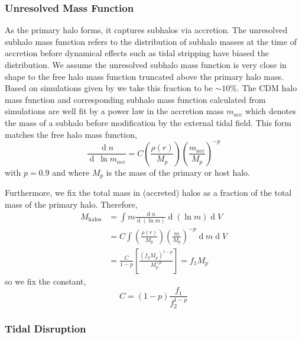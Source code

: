 \documentclass[usenatbib]{mnras}
\renewcommand{\d}[1]{\! \mathrm{d}#1 \:}
\newcommand{\deriv}[2]{\frac{\d{#1}}{\d{#2}}}
\renewcommand{\d}[1]{\ensuremath{\operatorname{d}\!{#1}}}
\begin{document}
\subsubsection{Unresolved Mass Function}

	As the primary halo forms, it captures subhalos via accretion. The unresolved subhalo mass function refers to the distribution of subhalo masses at the time of accretion before dynamical effects such as tidal stripping have biased the distribution. We assume the unresolved subhalo mass function is very close in shape to the free halo mass function truncated above the primary halo mass. Based on simulations given by \citet{dark_wave} we take this fraction to be $\sim 10\%$. The CDM halo mass function and corresponding subhalo mass function calculated from simulations \citep{pop_of_subhalos, unified_model} are well fit by a power law in the accretion mass $m_{acc}$ which denotes the mass of a subhalo before modification by the external tidal field. This form matches the free halo mass function, 
\begin{equation}
\frac{\d{n}}{\d{\: \ln{m_{acc}}}} = C \left(\frac{\rho(r)}{M_p}\right) \left(\frac{m_{acc}}{M_p} \right)^{-p} 
\end{equation}
with $p = 0.9$ and where $M_p$ is the mass of the primary or host halo.
\par
Furthermore, we fix the total mass in (accreted) halos as a fraction of the total mass of the primary halo. Therefore,
\begin{subequations}
\begin{align}
M_{\mathrm{halos}} & = \int m \deriv{n}{(\ln{m})} \d{(\ln{m})} \d{V}
\\
& = C \int \left(\frac{\rho(r)}{M_p}\right) \left(\frac{m}{M_p} \right)^{-p} \d{m} \d{V} 
\\
& = \frac{C}{1-p} \left[ \frac{(f_2 M_p)^{1-p}}{M_p^{-p}} \right] = f_1 M_p 
\end{align} 
\end{subequations}
so we fix the constant,
\begin{equation}
C = (1 - p)\frac{f_1}{f_2^{1-p}} 
\end{equation}

\subsubsection{Tidal Disruption} 
\end{document}
